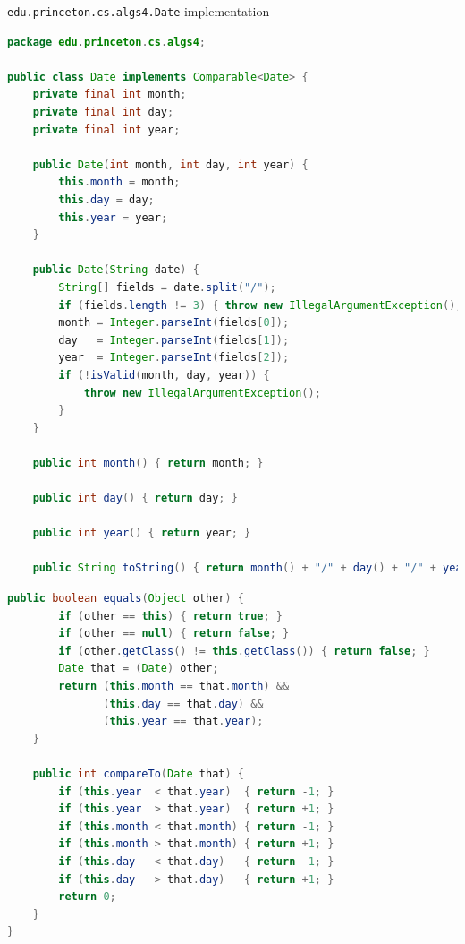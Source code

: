 \documentclass[8pt,a4paper,compress]{beamer}
\begin{document}
\begin{frame}[fragile]
\pause

\lstinline{edu.princeton.cs.algs4.Date} implementation
\begin{lstlisting}[language=Java]
package edu.princeton.cs.algs4;

public class Date implements Comparable<Date> {
    private final int month;
    private final int day;
    private final int year;
    
    public Date(int month, int day, int year) { 
        this.month = month; 
        this.day = day; 
        this.year = year; 
    }
    
    public Date(String date) {
        String[] fields = date.split("/");
        if (fields.length != 3) { throw new IllegalArgumentException(); }
        month = Integer.parseInt(fields[0]);
        day   = Integer.parseInt(fields[1]);
        year  = Integer.parseInt(fields[2]);
        if (!isValid(month, day, year)) {
            throw new IllegalArgumentException();
        }
    }
   
    public int month() { return month; }

    public int day() { return day; }

    public int year() { return year; }
    
    public String toString() { return month() + "/" + day() + "/" + year(); }
\end{lstlisting}
\end{frame}

\begin{frame}[fragile]
\pause

\begin{lstlisting}[language=Java]
    public boolean equals(Object other) {
        if (other == this) { return true; }
        if (other == null) { return false; }
        if (other.getClass() != this.getClass()) { return false; }
        Date that = (Date) other;
        return (this.month == that.month) && 
               (this.day == that.day) && 
               (this.year == that.year);
    }
    
    public int compareTo(Date that) {
        if (this.year  < that.year)  { return -1; }
        if (this.year  > that.year)  { return +1; }
        if (this.month < that.month) { return -1; }
        if (this.month > that.month) { return +1; }
        if (this.day   < that.day)   { return -1; }
        if (this.day   > that.day)   { return +1; }
        return 0;
    }
}
\end{lstlisting}
\end{frame}
\end{document}
